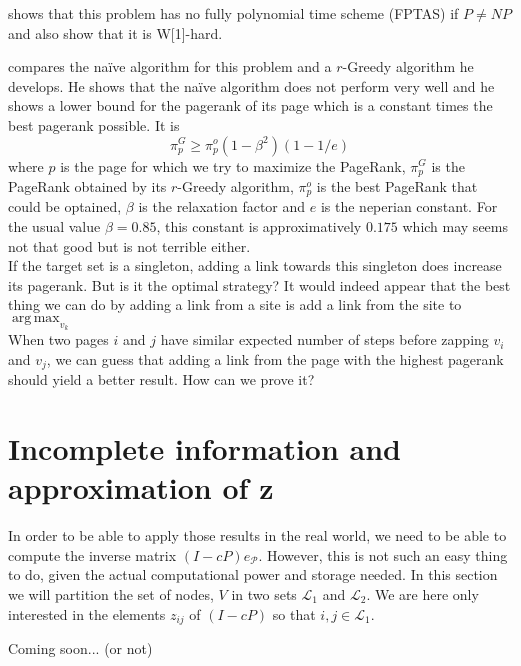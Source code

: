 \documentclass{article}
\DeclareMathOperator*{\argmax}{arg\,max}
\newcommand{\1}{\mathbf{1}}
\theoremstyle{definition}
\begin{document}
\cite{olsen2010maximizing} shows that this problem has no fully polynomial time scheme (FPTAS) if \(P \neq NP\) and also show that it is W[1]-hard.

\cite{olsen2010constant} compares the naïve algorithm for this problem and a \(r\)-Greedy algorithm he develops.
He shows that the naïve algorithm does not perform very well and he shows a lower bound for the pagerank of its page which is a constant times the best pagerank possible. It is
\[ \pi_p^G \geq \pi_p^o(1 - \beta^2)(1 - 1/e) \]
where \(p\) is the page for which we try to maximize the PageRank,
\(\pi_p^G\) is the PageRank obtained by its \(r\)-Greedy algorithm, \(\pi_p^o\) is the best PageRank that could be optained, \(\beta\) is the relaxation factor and \(e\) is the neperian constant.
For the usual value \(\beta = 0.85\), this constant is approximatively \(0.175\) which may seems not that good but is not terrible either.\\
If the target set is a singleton, adding a link towards this singleton does increase its pagerank. But is it the optimal strategy? It would indeed appear that the best thing we can do by adding a link from a site is add a link from the site to \(\argmax_{v_k}\)\\ 
When two pages \(i\) and \(j\) have similar expected number of steps before zapping \(v_i\) and \(v_j\), we can guess that adding a link from the page with the highest pagerank should yield a better result. How can we prove it?

\section{Incomplete information and approximation of z}
In order to be able to apply those results in the real world, we need to be able to compute the inverse matrix \((I-cP)e_{\mathcal{P}}\). However, this is not such an easy thing to do, given the actual computational power and storage needed. In this section we will partition the set of nodes, \(V\) in two sets \(\mathcal{L}_1\) and \(\mathcal{L}_2\). We are here only interested in the elements \(z_{ij}\) of \((I-cP)\) so that \(i,j \in \mathcal{L}_1\).

Coming soon... (or not)



\end{document}
